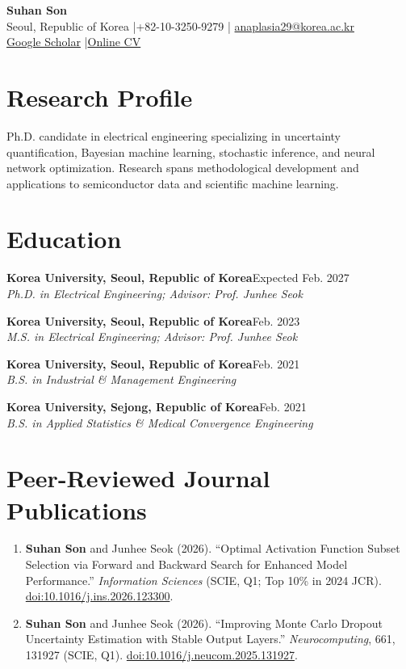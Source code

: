 \documentclass[a4paper,10pt]{article}
\newcommand{\entry}[3]{\textbf{#1}\hfill{\small #2}\\[-1pt]{\small\textit{#3}}\par}
\newcommand{\tightgap}{\vspace{5pt}}
\begin{document}
\begin{center}
{\LARGE\bfseries Suhan Son}\\[4pt]
\small Seoul, Republic of Korea \quad|\quad +82-10-3250-9279 \quad|\quad
\href{mailto:anaplasia29@korea.ac.kr}{anaplasia29@korea.ac.kr}\\[2pt]
\href{https://scholar.google.com/citations?user=mq_i7_oAAAAJ}{Google Scholar} \quad|\quad \href{https://anaplasia29.github.io/my-CV/cv.pdf}{Online CV}
\end{center}
\vspace{-5pt}

\section{Research Profile}

Ph.D. candidate in electrical engineering specializing in uncertainty quantification, Bayesian
machine learning, stochastic inference, and neural network optimization. Research spans
methodological development and applications to semiconductor data and scientific machine learning.

\section{Education}

\entry{Korea University, Seoul, Republic of Korea}
  {Expected Feb. 2027}
  {Ph.D. in Electrical Engineering; Advisor: Prof. Junhee Seok}

\tightgap

\entry{Korea University, Seoul, Republic of Korea}
  {Feb. 2023}
  {M.S. in Electrical Engineering; Advisor: Prof. Junhee Seok}

\tightgap

\entry{Korea University, Seoul, Republic of Korea}
  {Feb. 2021}
  {B.S. in Industrial \& Management Engineering}

\tightgap

\entry{Korea University, Sejong, Republic of Korea}
  {Feb. 2021}
  {B.S. in Applied Statistics \& Medical Convergence Engineering}

\section{Peer-Reviewed Journal Publications}

\begin{enumerate}[leftmargin=1.65em,itemsep=6pt,topsep=0pt]
\item \textbf{Suhan Son} and Junhee Seok (2026). ``Optimal Activation Function Subset Selection via
  Forward and Backward Search for Enhanced Model Performance.'' \textit{Information Sciences} (SCIE,
  Q1; Top 10\% in 2024 JCR).
  \href{https://doi.org/10.1016/j.ins.2026.123300}{doi:10.1016/j.ins.2026.123300}.
\item \textbf{Suhan Son} and Junhee Seok (2026). ``Improving Monte Carlo Dropout Uncertainty
  Estimation with Stable Output Layers.'' \textit{Neurocomputing}, 661, 131927 (SCIE, Q1).
  \href{https://doi.org/10.1016/j.neucom.2025.131927}{doi:10.1016/j.neucom.2025.131927}.
\end{enumerate}
\end{document}
